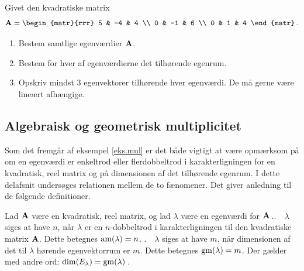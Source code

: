 \begin{exercise}
Givet den kvadratiske matrix
\begin{equation}
\mA = \begin{matr}{rrr} 5 & -4 & 4 \\ 0 & -1 & 6 \\ 0 & 1 & 4 \end{matr}\,.
\end{equation}
\begin{enumerate}
\item Bestem samtlige egenværdier $ \mathbf{A} $.
\item Bestem for hver af egenværdierne det tilhørende egenrum.
\item Opskriv mindst 3 egenvektorer tilhørende hver egenværdi. De må gerne være lineært afhængige.
\end{enumerate}
\end{exercise}

\subsection{Algebraisk og geometrisk multiplicitet} \label{af.multi}

Som det fremgår af eksempel \ref{eks.mul} er det både vigtigt at være opmærksom på om en egenværdi er enkeltrod eller flerdobbeltrod i karakterligningen for en kvadratisk, reel matrix og på dimensionen af det tilhørende egenrum. I dette delafsnit undersøges relationen mellem de to fænomener. Det giver anledning til de følgende definitioner. 

\begin{definition} \label{def.mul}
Lad $\mathbf{A}$ være en kvadratisk, reel matrix, og lad $\lambda$ være en egenværdi for $\mathbf{A}\,$..$\quad \lambda $ siges at have  $ n $, når $ \lambda $ er en $ n $-dobbeltrod i karakterligningen til den kvadratiske matrix $ \mathbf{A} $. Dette betegnes $ \mathrm{am}(\lambda) = n $. .$\quad \lambda $ siges at have  $ m $, når dimensionen af det til $ \lambda $ hørende egenvektorrum er $ m $. Dette betegnes $ \mathrm{gm}(\lambda) = m $. Der gælder med andre ord: $\dim(E_{\lambda})=\mathrm{gm}(\lambda)\,$.
\end{definition}

